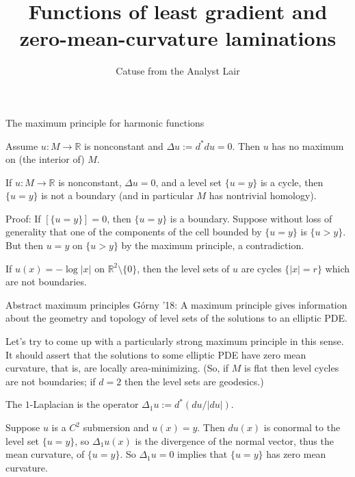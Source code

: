 \documentclass[10pt]{beamer}
\newcommand{\RR}{\mathbb{R}}
\begin{document}
\title{Functions of least gradient and zero-mean-curvature laminations}
\author{Catuse from the Analyst Lair}
\begin{frame}
    \titlepage
\end{frame}

\begin{frame}{The maximum principle for harmonic functions}
\begin{theorem}
Assume $u: M \to \RR$ is nonconstant and $\Delta u := d^*d u = 0$.
Then $u$ has no maximum on (the interior of) $M$.
\end{theorem}

\pause

\begin{corollary}
If $u: M \to \RR$ is nonconstant, $\Delta u = 0$, and a level set $\{u = y\}$ is a cycle, then $\{u = y\}$ is not a boundary (and in particular $M$ has nontrivial homology).
\end{corollary}

\pause

Proof: If $[\{u = y\}] = 0$, then $\{u = y\}$ is a boundary. Suppose without loss of generality that one of the components of the cell bounded by $\{u = y\}$ is $\{u > y\}$. But then $u = y$ on $\{u > y\}$ by the maximum principle, a contradiction.

\pause

\begin{example}
If $u(x) = -\log |x|$ on $\RR^2 \setminus \{0\}$, then the level sets of $u$ are cycles $\{|x| = r\}$ which are not boundaries.
\end{example}

\end{frame}

\begin{frame}{Abstract maximum principles}
G\'orny '18: A maximum principle gives information about the geometry and topology of level sets of the solutions to an elliptic PDE.

\pause

Let's try to come up with a particularly strong maximum principle in this sense. It should assert that the solutions to some elliptic PDE have zero mean curvature, that is, are locally area-minimizing.
(So, if $M$ is flat then level cycles are not boundaries; if $d = 2$ then the level sets are geodesics.)

\pause

\begin{definition}
The $1$-Laplacian is the operator $\Delta_1 u := d^*(du/|du|)$.
\end{definition}

\pause

Suppose $u$ is a $C^2$ submersion and $u(x) = y$.
Then $du(x)$ is conormal to the level set $\{u = y\}$, so $\Delta_1 u(x)$ is the divergence of the normal vector, thus the mean curvature, of $\{u = y\}$.
So $\Delta_1 u = 0$ implies that $\{u = y\}$ has zero mean curvature.
\end{frame}
\end{document}
